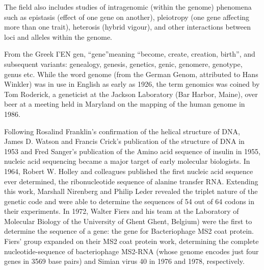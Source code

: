 The field also includes studies of intragenomic (within the genome) phenomena such as epistasis (effect of one gene on another), pleiotropy (one gene affecting more than one trait), heterosis (hybrid vigour), and other interactions between loci and alleles within the genome.

From the Greek ΓΕΝ gen, ``gene''meaning ``become, create, creation, birth'', and subsequent variants: genealogy, genesis, genetics, genic, genomere, genotype, genus etc. While the word genome (from the German Genom, attributed to Hans Winkler) was in use in English as early as 1926, the term genomics was coined by Tom Roderick, a geneticist at the Jackson Laboratory (Bar Harbor, Maine), over beer at a meeting held in Maryland on the mapping of the human genome in 1986.

Following Rosalind Franklin's confirmation of the helical structure of DNA, James D. Watson and Francis Crick's publication of the structure of DNA in 1953 and Fred Sanger's publication of the Amino acid sequence of insulin in 1955, nucleic acid sequencing became a major target of early molecular biologists. In 1964, Robert W. Holley and colleagues published the first nucleic acid sequence ever determined, the ribonucleotide sequence of alanine transfer RNA. Extending this work, Marshall Nirenberg and Philip Leder revealed the triplet nature of the genetic code and were able to determine the sequences of 54 out of 64 codons in their experiments. In 1972, Walter Fiers and his team at the Laboratory of Molecular Biology of the University of Ghent Ghent, Belgium) were the first to determine the sequence of a gene: the gene for Bacteriophage MS2 coat protein. Fiers' group expanded on their MS2 coat protein work, determining the complete nucleotide-sequence of bacteriophage MS2-RNA (whose genome encodes just four genes in 3569 base pairs) and Simian virus 40 in 1976 and 1978, respectively.

